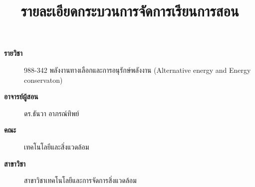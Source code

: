 \documentclass[a4paper,12pt]{article}
\begin{document}
\title{รายละเอียดกระบวนการจัดการเรียนการสอน\vspace{-2cm}}
\date{}
\maketitle

\begin{description}
    \item [\textbf{รายวิชา}] 988-342 พลังงานทางเลือกและการอนุรักษ์พลังงาน (Alternative energy and Energy conservaton)
    \item [\textbf{อาจารย์ผู้สอน}] ดร.ธันวา อาภรณ์ทิพย์
    \item [\textbf{คณะ}] เทคโนโลยีและสิ่งแวดล้อม
    \item [\textbf{สาขาวิชา}] สาขาวิชาเทคโนโลยีและการจัดการสิ่งแวดล้อม
\end{description}
\end{document}
